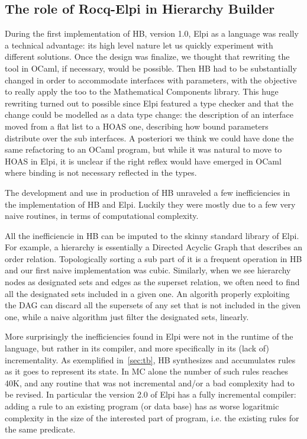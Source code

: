 \documentclass[a4paper, 11pt]{book}
\begin{document}
\subsection{The role of Rocq-Elpi in Hierarchy Builder}

During the first implementation of HB, version 1.0, Elpi as a language was
really a technical advantage: its high level nature let us quickly experiment
with different solutions. Once the design was finalize, we thought that rewriting
the tool in OCaml, if necessary, would be possible. Then HB had to be substantially
changed in order to accommodate interfaces with parameters, with the objective
to really apply the too to the Mathematical Components library. This huge rewriting
turned out to possible since Elpi featured a type checker and that the change
could be modelled as a data type change: the description of an interface moved from
a flat list to a HOAS one, describing how bound parameters distribute over
the sub interfaces. A posteriori we think we could have done the same
refactoring to an OCaml program, but while it was natural to move to HOAS
in Elpi, it is unclear if the right reflex would have emerged in OCaml where
binding is not necessary reflected in the types.

The development and use in production of HB unraveled a few inefficiencies
in the implementation of HB and Elpi. Luckily they were mostly due to
a few very naive routines, in terms of computational complexity.

All the inefficiencie in HB can be imputed to the skinny standard library
of Elpi. For example, a hierarchy is essentially a Directed Acyclic Graph that
describes an order relation. Topologically sorting a sub part of it is a
frequent operation in HB and our first naive implementation was cubic.
Similarly, when we see hierarchy nodes as designated sets and
edges as the superset relation, we often need to find all the designated
sets included in a given one. An algorith properly exploiting the DAG
can discard all the supersets of any set that is not included in the given one,
while a naive algorithm just filter the designated sets, linearly.

More surprisingly the inefficiencies found in Elpi were not in the runtime
of the language, but rather in its compiler, and more specifically in
its (lack of) incrementality. As exemplified in~\ref{sec:tb}, HB synthesizes
and accumulates rules as it goes to represent its state. In MC alone
the number of such rules reaches 40K, and any routine that was not incremental
and/or a bad complexity had to be revised. In particular the version 2.0 of
Elpi has a fully incremental compiler: adding a rule to an existing program (or
data base) has as worse logaritmic complexity in the size of the interested
part of program, i.e. the existing rules for the same predicate.
\end{document}
